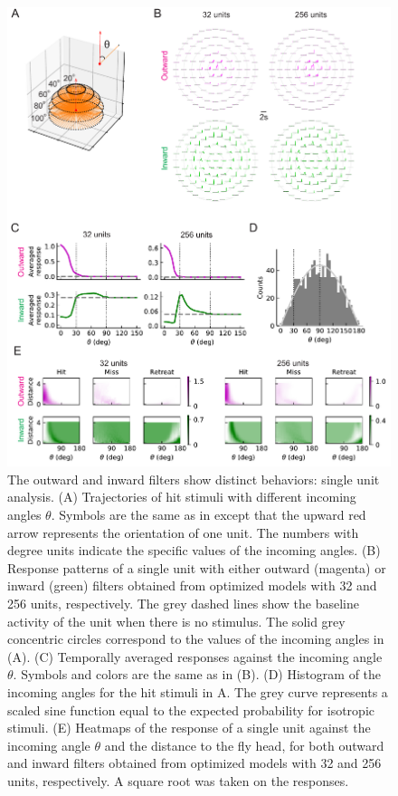 \documentclass[pdftex,9pt,lineno]{elife}
\begin{document}
\begin{figure}
\includegraphics[width=\linewidth]{figures/compare_outward_inward_single_unit_paper.pdf}
\caption{The outward and inward filters show distinct behaviors: single unit analysis. (A) Trajectories of hit stimuli with different incoming angles $\theta$. Symbols are the same as in  except that the upward red arrow represents the orientation of one unit. The numbers with degree units indicate the specific values of the incoming angles. (B) Response patterns of a single unit with either outward (magenta) or inward (green) filters obtained from optimized models with 32 and 256 units, respectively. The grey dashed lines show the baseline activity of the unit when there is no stimulus. The solid grey concentric circles correspond to the values of the incoming angles in (A). (C) Temporally averaged responses against the incoming angle $\theta$. Symbols and colors are the same as in (B). (D) Histogram of the incoming angles for the hit stimuli in A. The grey curve represents a scaled sine function equal to the expected probability for isotropic stimuli. (E) Heatmaps of the response of a single unit against the incoming angle $\theta$ and the distance to the fly head, for both outward and inward filters obtained from optimized models with 32 and 256 units, respectively. A square root was taken on the responses.}
\label{fig:compareSingle}
\end{figure}
\end{document}

